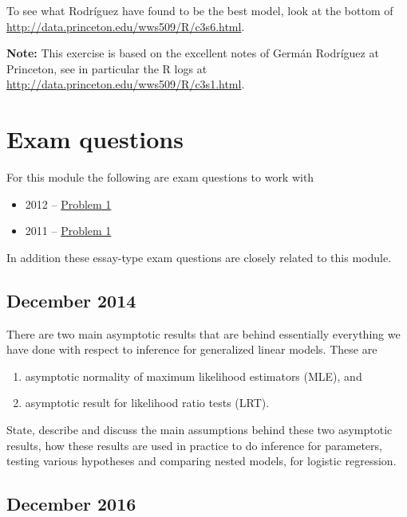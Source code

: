 \documentclass[
]{article}
\providecommand{\tightlist}{%
  \setlength{\itemsep}{0pt}\setlength{\parskip}{0pt}}
\begin{document}
To see what Rodríguez have found to be the best model, look at the
bottom of \url{http://data.princeton.edu/wws509/R/c3s6.html}.

\textbf{Note:} This exercise is based on the excellent notes of Germán
Rodríguez at Princeton, see in particular the R logs at
\url{http://data.princeton.edu/wws509/R/c3s1.html}.

\hypertarget{exam-questions}{%
\section{Exam questions}\label{exam-questions}}

For this module the following are exam questions to work with

\begin{itemize}
\tightlist
\item
  2012 --
  \href{https://www.math.ntnu.no/emner/TMA4315/Exam/GLMeksamen2012E.pdf}{Problem
  1}
\item
  2011 --
  \href{https://www.math.ntnu.no/emner/TMA4315/Exam/eksDes11e.pdf}{Problem
  1}
\end{itemize}

In addition these essay-type exam questions are closely related to this
module.

\hypertarget{december-2014}{%
\subsection{December 2014}\label{december-2014}}

There are two main asymptotic results that are behind essentially
everything we have done with respect to inference for generalized linear
models. These are

\begin{enumerate}
\def\labelenumi{\arabic{enumi}.}
\item
  asymptotic normality of maximum likelihood estimators (MLE), and
\item
  asymptotic result for likelihood ratio tests (LRT).
\end{enumerate}

State, describe and discuss the main assumptions behind these two
asymptotic results, how these results are used in practice to do
inference for parameters, testing various hypotheses and comparing
nested models, for logistic regression.

\hypertarget{december-2016}{%
\subsection{December 2016}\label{december-2016}}
\end{document}
